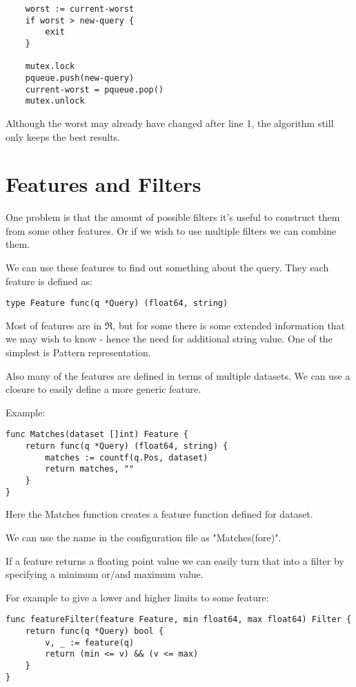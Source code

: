 \begin{verbatim}
	worst := current-worst
	if worst > new-query {
		exit
	}

	mutex.lock
	pqueue.push(new-query)
	current-worst = pqueue.pop()
	mutex.unlock
\end{verbatim}

Although the worst may already have changed after line 1, the algorithm still only keeps the best results.

\section{Features and Filters}

One problem is that the amount of possible filters it's useful to construct them from some other features. 
Or if we wish to use multiple filters we can combine them.

We can use these features to find out something about the query.
They each feature is defined as:

\begin{verbatim}
type Feature func(q *Query) (float64, string)
\end{verbatim}

Most of features are in $\Re$, but for some there
is some extended information that we may wish to know - hence
the need for additional string value. One of the simplest
is Pattern representation.

Also many of the features are defined in terms of multiple datasets.
We can use a closure to easily define a more generic feature.

Example:

\begin{verbatim}
func Matches(dataset []int) Feature {
	return func(q *Query) (float64, string) {
		matches := countf(q.Pos, dataset)
		return matches, ""
	}
}
\end{verbatim}

Here the Matches function creates a feature function defined
for dataset.

We can use the name in the configuration file as "Matches(fore)".

If a feature returns a floating point value we can easily turn that
into a filter by specifying a minimum or/and maximum value.

For example to give a lower and higher limits to some feature:

\begin{verbatim}
func featureFilter(feature Feature, min float64, max float64) Filter {
	return func(q *Query) bool {
		v, _ := feature(q)
		return (min <= v) && (v <= max)
	}
}
\end{verbatim}


